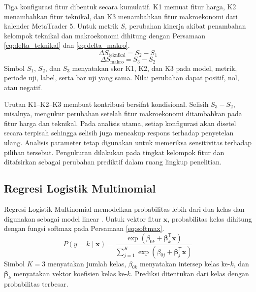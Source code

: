 Tiga konfigurasi fitur dibentuk secara kumulatif. K1 memuat fitur harga, K2 menambahkan fitur teknikal, dan K3 menambahkan fitur makroekonomi dari kalender MetaTrader 5. Untuk metrik $S$, perubahan kinerja akibat penambahan kelompok teknikal dan makroekonomi dihitung dengan Persamaan \ref{eq:delta_teknikal} dan \ref{eq:delta_makro}.
\begin{equation}
\Delta S_{\mathrm{teknikal}}=S_2-S_1
\label{eq:delta_teknikal}
\end{equation}
\begin{equation}
\Delta S_{\mathrm{makro}}=S_3-S_2
\label{eq:delta_makro}
\end{equation}
Simbol $S_1$, $S_2$, dan $S_3$ menyatakan skor K1, K2, dan K3 pada model, metrik, periode uji, label, serta bar uji yang sama. Nilai perubahan dapat positif, nol, atau negatif.

Urutan K1--K2--K3 membuat kontribusi bersifat kondisional. Selisih $S_3-S_2$, misalnya, mengukur perubahan setelah fitur makroekonomi ditambahkan pada fitur harga dan teknikal. Pada analisis utama, setiap konfigurasi akan disetel secara terpisah sehingga selisih juga mencakup respons terhadap penyetelan ulang. Analisis parameter tetap digunakan untuk memeriksa sensitivitas terhadap pilihan tersebut. Pengukuran dilakukan pada tingkat kelompok fitur dan ditafsirkan sebagai perubahan prediktif dalam ruang lingkup penelitian.

\subsection{Regresi Logistik Multinomial}

Regresi Logistik Multinomial memodelkan probabilitas lebih dari dua kelas dan digunakan sebagai model linear \parencite{hosmer2013applied}. Untuk vektor fitur $\mathbf{x}$, probabilitas kelas dihitung dengan fungsi softmax pada Persamaan \ref{eq:softmax}.
\begin{equation}
P(y=k\mid\mathbf{x})=\frac{\exp\left(\beta_{0k}+\boldsymbol{\beta}_k^{\mathsf{T}}\mathbf{x}\right)}{\sum_{j=1}^{K}\exp\left(\beta_{0j}+\boldsymbol{\beta}_j^{\mathsf{T}}\mathbf{x}\right)}
\label{eq:softmax}
\end{equation}
Simbol $K=3$ menyatakan jumlah kelas, $\beta_{0k}$ menyatakan intersep kelas ke-$k$, dan $\boldsymbol{\beta}_k$ menyatakan vektor koefisien kelas ke-$k$. Prediksi ditentukan dari kelas dengan probabilitas terbesar.

